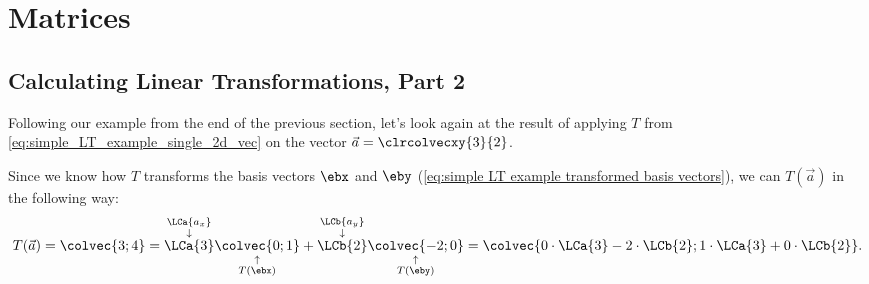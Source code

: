 \section{Matrices}

\subsection{Calculating Linear Transformations, Part 2}
Following our example from the end of the previous section, let's look again at the result of applying $T$ from \autoref{eq:simple_LT_example_single_2d_vec} on the vector $\vec{a}=\clrcolvecxy{3}{2}$.

Since we know how $T$ transforms the basis vectors $\ebx$ and $\eby$ (\autoref{eq:simple LT example transformed basis vectors}), we can $T(\vec{a})$ in the following way:
\begin{equation}
	T(\vec{a}) = \colvec{3;4} = \overset{\substack{\LCa{a_{x}} \\ \downarrow}}{\LCa{3}}\underset{\substack{\uparrow \\ T(\ebx)}}{\colvec{0;1}} + \overset{\substack{\LCb{a_{y}} \\ \downarrow}}{\LCb{2}}\underset{\substack{\uparrow \\ T(\eby)}}{\colvec{-2;0}} = \colvec{0\cdot\LCa{3}-2\cdot\LCb{2};1\cdot\LCa{3}+0\cdot\LCb{2}}.
	\label{eq:developing matrix notation step 1}
\end{equation}

